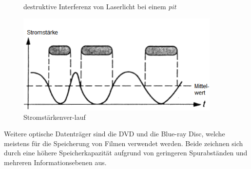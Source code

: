 {\begin{figure}[h]
\begin{center}
\begin{minipage}[t]{0.3\textwidth}
\begin{center}
                    \caption[destruktive Interferenz von Laserlicht bei einem \textit{pit} \newline \url{http://www.muenster.de/~asshoff/physik/cd/image50.gif} (zuletzt aufgerufen am 07.08.2015)]{destruktive Interferenz von Laserlicht bei einem \textit{pit}}
                    \label{fig:cdlaser}
                \end{center}
            \end{minipage}
            \hspace{0.025\textwidth}
            \begin{minipage}[t]{0.3\textwidth}
                \begin{center}
                    \includegraphics[width=0.9\textwidth]{Bilder/Optische_Datentraeger_Die_Compact_Disc/Funktionsweise/cdstrom.png}
                    \caption[Stromstärkenverlauf \newline \url{http://www.muenster.de/~asshoff/physik/cd/image51.gif} (zuletzt aufgerufen am 07.08.2015)]{Stromstärkenver-lauf}
                    \label{fig:cdstrom}
                \end{center}
            \end{minipage}
        \end{center}
    \end{figure}
}{}

Weitere optische Datenträger sind die DVD und die Blue-ray Disc, welche meistens
für die Speicherung von Filmen verwendet werden. Beide zeichnen sich durch eine
höhere Speicherkapazität aufgrund von geringeren Spurabständen und mehreren
Informationsebenen aus.

